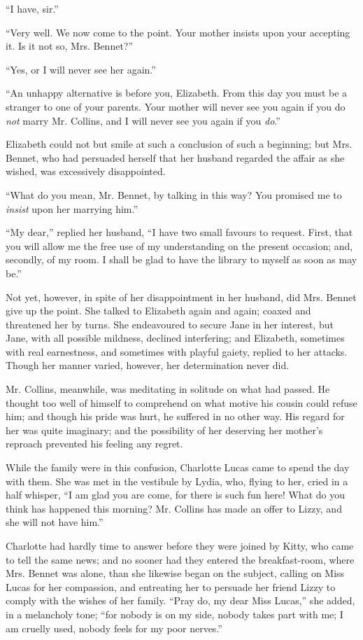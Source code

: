 ``I have, sir.''

``Very well. We now come to the point. Your mother insists upon your accepting it. Is it not so, Mrs. Bennet?''

``Yes, or I will never see her again.''

``An unhappy alternative is before you, Elizabeth. From this day you must be a stranger to one of your parents. Your mother will never see you again if you do \textit{not} marry Mr. Collins, and I will never see you again if you \textit{do}.''

Elizabeth could not but smile at such a conclusion of such a beginning; but Mrs. Bennet, who had persuaded herself that her husband regarded the affair as she wished, was excessively disappointed.

``What do you mean, Mr. Bennet, by talking in this way? You promised me to \textit{insist} upon her marrying him.''

``My dear,'' replied her husband, ``I have two small favours to request. First, that you will allow me the free use of my understanding on the present occasion; and, secondly, of my room. I shall be glad to have the library to myself as soon as may be.''

Not yet, however, in spite of her disappointment in her husband, did Mrs. Bennet give up the point. She talked to Elizabeth again and again; coaxed and threatened her by turns. She endeavoured to secure Jane in her interest, but Jane, with all possible mildness, declined interfering; and Elizabeth, sometimes with real earnestness, and sometimes with playful gaiety, replied to her attacks. Though her manner varied, however, her determination never did.

Mr. Collins, meanwhile, was meditating in solitude on what had passed. He thought too well of himself to comprehend on what motive his cousin could refuse him; and though his pride was hurt, he suffered in no other way. His regard for her was quite imaginary; and the possibility of her deserving her mother's reproach prevented his feeling any regret.

While the family were in this confusion, Charlotte Lucas came to spend the day with them. She was met in the vestibule by Lydia, who, flying to her, cried in a half whisper, ``I am glad you are come, for there is such fun here! What do you think has happened this morning? Mr. Collins has made an offer to Lizzy, and she will not have him.''




Charlotte had hardly time to answer before they were joined by Kitty, who came to tell the same news; and no sooner had they entered the breakfast-room, where Mrs. Bennet was alone, than she likewise began on the subject, calling on Miss Lucas for her compassion, and entreating her to persuade her friend Lizzy to comply with the wishes of her family. ``Pray do, my dear Miss Lucas,'' she added, in a melancholy tone; ``for nobody is on my side, nobody takes part with me; I am cruelly used, nobody feels for my poor nerves.''


